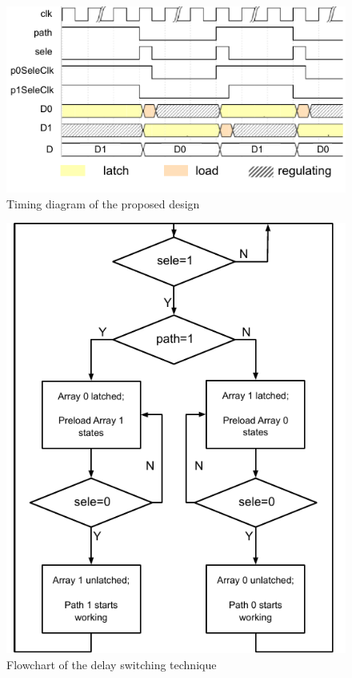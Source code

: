 \documentclass[journal]{IEEEtran}
\begin{document}
\begin{figure}[t!]
    \centering
    \includegraphics[width=\linewidth]{pic/struc/timing.pdf}
    \caption{Timing diagram of the proposed design}
    \label{fig:timing}
\end{figure}
\begin{figure}[t!]
    \centering
    \includegraphics[width=\linewidth]{pic/struc/flowChart.pdf}
    \caption{Flowchart of the delay switching technique}
    \label{fig:flowchart}
\end{figure}
\end{document}
